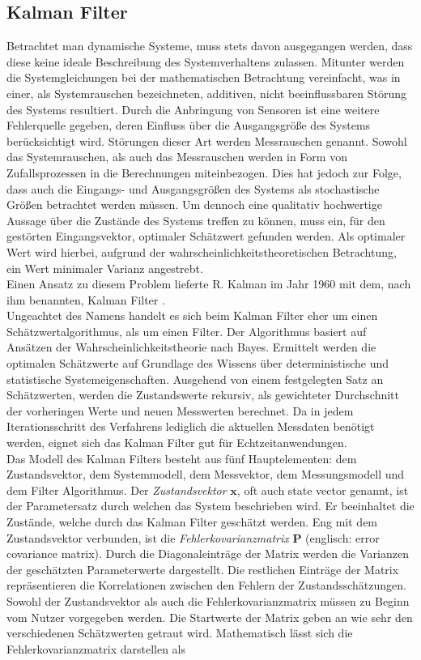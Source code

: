 \subsection{Kalman Filter}
Betrachtet man dynamische Systeme, muss stets davon ausgegangen werden, dass diese keine ideale Beschreibung des Systemverhaltens zulassen.
Mitunter werden die Systemgleichungen bei der mathematischen Betrachtung vereinfacht, was in einer, als Systemrauschen bezeichneten, additiven, nicht beeinflussbaren Störung des Systems resultiert.
Durch die Anbringung von Sensoren ist eine weitere Fehlerquelle gegeben, deren Einfluss über die Ausgangsgröße des Systems berücksichtigt wird. Störungen dieser Art werden Messrauschen genannt.
Sowohl das Systemrauschen, als auch das Messrauschen werden in Form von Zufallsprozessen in die Berechnungen miteinbezogen. Dies hat jedoch zur Folge, dass auch die Eingangs- und Ausgangsgrößen des Systems als stochastische Größen betrachtet werden müssen.
Um dennoch eine qualitativ hochwertige Aussage über die Zustände des Systems treffen zu können, muss ein, für den gestörten Eingangsvektor, optimaler Schätzwert gefunden werden. Als optimaler Wert wird hierbei, aufgrund der wahrscheinlichkeitstheoretischen Betrachtung, ein Wert minimaler Varianz angestrebt. \cite{Sys2}
\\Einen Ansatz zu diesem Problem lieferte R. Kalman im Jahr 1960 mit dem, nach ihm benannten, Kalman Filter \cite{kalman}.
\\Ungeachtet des Namens handelt es sich beim Kalman Filter eher um einen Schätzwertalgorithmus, als um einen Filter. Der Algorithmus basiert auf Ansätzen der Wahrscheinlichkeitstheorie nach Bayes. Ermittelt werden die optimalen Schätzwerte auf Grundlage des Wissens über deterministische und statistische Systemeigenschaften. Ausgehend von einem festgelegten Satz an Schätzwerten, werden die Zustandswerte rekursiv, als gewichteter Durchschnitt der vorheringen Werte und neuen Messwerten berechnet. Da in jedem Iterationsschritt des Verfahrens lediglich die aktuellen Messdaten benötigt werden, eignet sich das Kalman Filter gut für Echtzeitanwendungen. \cite{P32}
\\Das Modell des Kalman Filters besteht aus fünf Hauptelementen: dem Zustandsvektor, dem Systemmodell, dem Messvektor, dem Messungsmodell und dem Filter Algorithmus.
Der \textit{Zustandsvektor} $\mathbf{x}$, oft auch state vector genannt, ist der Parametersatz durch welchen das System beschrieben wird. Er beeinhaltet die Zustände, welche durch das Kalman Filter geschätzt werden. Eng mit dem Zustandsvektor verbunden, ist die \textit{Fehlerkovarianzmatrix} $\mathbf{P}$ (englisch: error covariance matrix). Durch die Diagonaleinträge der Matrix werden die Varianzen der geschätzten Parameterwerte dargestellt. Die restlichen Einträge der Matrix repräsentieren die Korrelationen zwischen den Fehlern der Zustandsschätzungen. Sowohl der Zustandsvektor als auch die Fehlerkovarianzmatrix müssen zu Beginn vom Nutzer vorgegeben werden. Die Startwerte der Matrix geben an wie sehr den verschiedenen Schätzwerten getraut wird. Mathematisch lässt sich die Fehlerkovarianzmatrix darstellen als
